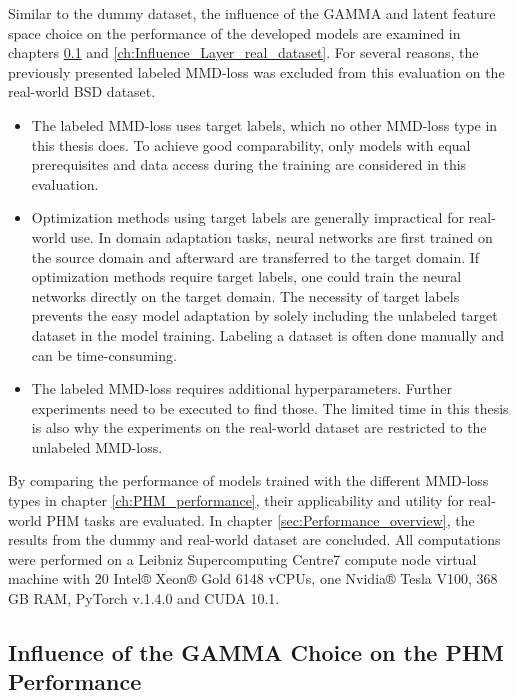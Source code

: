 Similar to the dummy dataset, the influence of the GAMMA and latent feature space choice on the performance of the developed models are examined in chapters \ref{ch:Influence_GAMMA_real_dataset} and \ref{ch:Influence_Layer_real_dataset}. For several reasons, the previously presented labeled MMD-loss was excluded from this evaluation on the real-world BSD dataset. 
\begin{itemize}
    \item The labeled MMD-loss uses target labels, which no other MMD-loss type in this thesis does. To achieve good comparability, only models with equal prerequisites and data access during the training are considered in this evaluation.
    \item Optimization methods using target labels are generally impractical for real-world use. In domain adaptation tasks, neural networks are first trained on the source domain and afterward are transferred to the target domain. If optimization methods require target labels, one could train the neural networks directly on the target domain. The necessity of target labels prevents the easy model adaptation by solely including the unlabeled target dataset in the model training. Labeling a dataset is often done manually and can be time-consuming.
    \item The labeled MMD-loss requires additional hyperparameters. Further experiments need to be executed to find those. The limited time in this thesis is also why the experiments on the real-world dataset are restricted to the unlabeled MMD-loss. 
\end{itemize}

By comparing the performance of models trained with the different MMD-loss types in chapter \ref{ch:PHM_performance}, their applicability and utility for real-world PHM tasks are evaluated. In chapter \ref{sec:Performance_overview}, the results from the dummy and real-world dataset are concluded. All computations were performed on a Leibniz Supercomputing Centre7 compute node virtual machine with 20 Intel® Xeon® Gold 6148 vCPUs, one Nvidia® Tesla V100, 368 GB RAM, PyTorch v.1.4.0 and CUDA 10.1.


\subsection{Influence of the GAMMA Choice on the PHM Performance}\label{ch:Influence_GAMMA_real_dataset}

